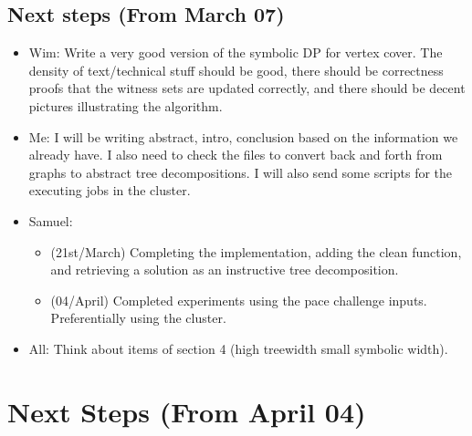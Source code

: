 \subsection{Next steps (From March 07)}

\begin{itemize}
\item Wim: Write a very good version of the symbolic DP for vertex cover. The density of text/technical stuff should be good, there should be correctness proofs that the witness sets are updated correctly, and there should be decent pictures illustrating the algorithm. 
\item Me: I will be writing abstract, intro, conclusion based on the information we already have. I also need to check the files to convert back and forth from graphs to abstract tree decompositions. 
I will also send some scripts for the executing jobs in the cluster. 
\item Samuel:
\begin{itemize}
\item (21st/March) Completing the implementation, adding the clean function, and retrieving a solution as an instructive tree decomposition. 
\item (04/April) Completed experiments using the pace challenge inputs. Preferentially using the cluster. 
\end{itemize}
\item All: Think about items of section 4 (high treewidth small symbolic width). 
\end{itemize}


\section{Next Steps (From April 04)}

